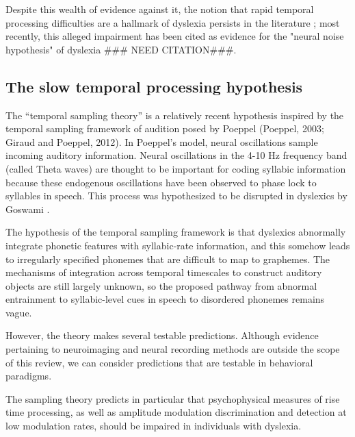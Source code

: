 \documentclass[../uwthesis.tex]{subfiles}
\begin{document}
Despite this wealth of evidence against it, the notion that rapid temporal processing difficulties are a hallmark of dyslexia persists in the literature \cite{Vandermosten2010AdultsCues,Vandermosten2011ImpairmentsDifficulties,Goswami2015SensoryResearch}; most recently, this alleged impairment has been cited as evidence for the "neural noise hypothesis" of dyslexia \cite{Hancock}### NEED CITATION###.

\subsection{The slow temporal processing hypothesis}
The “temporal sampling theory” is a relatively recent hypothesis inspired by the temporal sampling framework of audition posed by Poeppel (Poeppel, 2003; Giraud and Poeppel, 2012). In
Poeppel’s model, neural oscillations sample incoming auditory information. Neural oscillations in the 4-10 Hz frequency band (called Theta waves) are thought to be important for coding syllabic information because these endogenous oscillations have been observed to phase lock to syllables in
speech. This process was hypothesized to be disrupted in dyslexics by Goswami \cite{Goswami2011ADyslexia}.

The hypothesis of the temporal sampling framework is that dyslexics abnormally integrate phonetic features with syllabic-rate information, and this somehow leads to irregularly
specified phonemes that are difficult to map to graphemes. The mechanisms of integration across temporal timescales to construct auditory objects are still largely unknown, so the proposed pathway from abnormal entrainment to syllabic-level cues in speech to disordered phonemes remains vague.

However, the theory makes several testable predictions. Although evidence pertaining to neuroimaging and neural recording methods are outside the scope of this review, we can consider predictions that are testable in behavioral paradigms.

The sampling theory predicts in particular that psychophysical measures of rise time processing, as well as amplitude modulation discrimination and detection at low modulation rates, should be impaired in individuals with dyslexia. 
\end{document}
